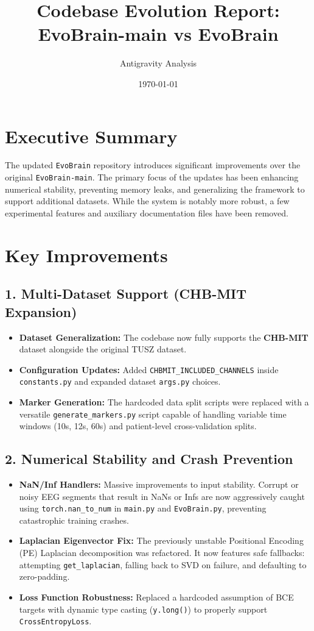 \documentclass{article}
\title{Codebase Evolution Report: EvoBrain-main vs EvoBrain}
\author{Antigravity Analysis}
\date{\today}
\begin{document}
\maketitle

\section*{Executive Summary}
The updated \texttt{EvoBrain} repository introduces significant improvements over the original \texttt{EvoBrain-main}. The primary focus of the updates has been enhancing numerical stability, preventing memory leaks, and generalizing the framework to support additional datasets. While the system is notably more robust, a few experimental features and auxiliary documentation files have been removed.

\section*{Key Improvements}
\subsection*{1. Multi-Dataset Support (CHB-MIT Expansion)}
\begin{itemize}[label=\textcolor{blue}{$\bullet$}]
    \item \textbf{Dataset Generalization:} The codebase now fully supports the \textbf{CHB-MIT} dataset alongside the original TUSZ dataset. 
    \item \textbf{Configuration Updates:} Added \texttt{CHBMIT\_INCLUDED\_CHANNELS} inside \texttt{constants.py} and expanded dataset \texttt{args.py} choices.
    \item \textbf{Marker Generation:} The hardcoded data split scripts were replaced with a versatile \texttt{generate\_markers.py} script capable of handling variable time windows (10s, 12s, 60s) and patient-level cross-validation splits.
\end{itemize}

\subsection*{2. Numerical Stability and Crash Prevention}
\begin{itemize}[label=\textcolor{blue}{$\bullet$}]
    \item \textbf{NaN/Inf Handlers:} Massive improvements to input stability. Corrupt or noisy EEG segments that result in NaNs or Infs are now aggressively caught using \texttt{torch.nan\_to\_num} in \texttt{main.py} and \texttt{EvoBrain.py}, preventing catastrophic training crashes.
    \item \textbf{Laplacian Eigenvector Fix:} The previously unstable Positional Encoding (PE) Laplacian decomposition was refactored. It now features safe fallbacks: attempting \texttt{get\_laplacian}, falling back to SVD on failure, and defaulting to zero-padding.
    \item \textbf{Loss Function Robustness:} Replaced a hardcoded assumption of BCE targets with dynamic type casting (\texttt{y.long()}) to properly support \texttt{CrossEntropyLoss}.
\end{itemize}
\end{document}
